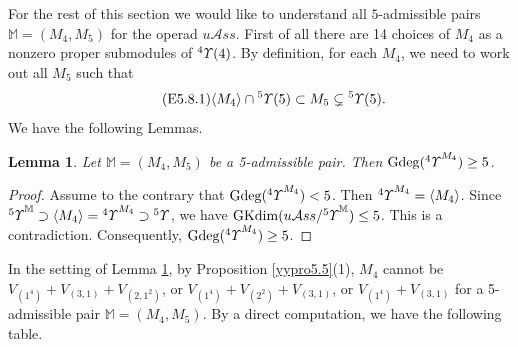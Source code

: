 \documentclass{amsart}
\newtheorem{lem}[thm]{Lemma}
\theoremstyle{definition}
\theoremstyle{remark}
\numberwithin{equation}{section}
\def\gd{\operatorname{Gdeg}}
\newcommand{\lr}[1]{\langle #1 \rangle}
\newcommand{\up}[1]{{^{#1}{\it \!\Upsilon}}}
\newcommand{\upa}[1]{{^{#1}{\it \!\Upsilon}}}
\def \uas{u\mathcal{A}ss}
\def\gkdim{\operatorname{GKdim}}
\begin{document}
For the rest of this section we would like to understand 
all $5$-admissible pairs ${\mathbb M}=(M_4,M_5)$ for the 
operad $\uas$. First of all there are 14 choices of $M_4$ 
as a nonzero proper submodules of $\up{4}(4)$. By definition, 
for each $M_4$, we need to work out all $M_5$ such that 
\begin{equation}
\label{E5.8.1}\tag{E5.8.1}
\langle M_4\rangle \cap \up{5}(5)\subset M_5
\subsetneq \up{5}(5).
\end{equation} 
We have the following Lemmas.

\begin{lem}
\label{yylem5.9}
Let $\mathbb{M}=(M_4, M_5)$ be a 5-admissible pair. Then 
$\gd(\up{4}^{M_4})\ge 5$.
\end{lem}
	
\begin{proof} 
Assume to the contrary that $\gd(\up{4}^{M_4})<5$. Then 
$\up{4}^{M_4}=\lr{M_4}$. Since $\upa{5}^{\mathbb{M}}
\supset \lr{M_4}=\up{4}^{M_4}\supset \up{5}$, we have 
$\gkdim (\uas/\upa{5}^{\mathbb{M}})\le 5$. This is a 
contradiction. Consequently, $\gd(\up{4}^{M_4})\ge 5$. 
\end{proof}

In the setting of Lemma \ref{yylem5.9}, by Proposition 
\ref{yypro5.5}(1), $M_4$ cannot be $V_{(1^4)}+V_{(3,1)}+V_{(2,1^2)}$, 
or $V_{(1^4)}+V_{(2^2)}+V_{(3,1)}$, or $V_{(1^4)}+V_{(3,1)}$ 
for a 5-admissible pair $\mathbb{M}=(M_4, M_5)$. By a direct 
computation, we have the following table.
	
\end{document}
